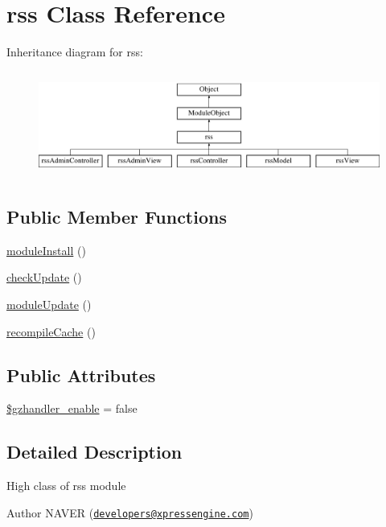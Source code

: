 \hypertarget{classrss}{\section{rss Class Reference}
\label{classrss}
}
Inheritance diagram for rss\-:\begin{figure}[H]
\begin{center}
\leavevmode
\includegraphics[height=3.500000cm]{classrss}
\end{center}
\end{figure}
\subsection*{Public Member Functions}
\begin{DoxyCompactItemize}
\item 
\hyperlink{classrss_a6730f54dbfe8b8d31066f3658f02185b}{module\-Install} ()
\item 
\hyperlink{classrss_abea52ff499087ead7116c986080a685a}{check\-Update} ()
\item 
\hyperlink{classrss_a68d8a7c97f3afd095c5ed5c1a304e8e5}{module\-Update} ()
\item 
\hyperlink{classrss_a422550360916bdd9ced66d334f75f3a9}{recompile\-Cache} ()
\end{DoxyCompactItemize}
\subsection*{Public Attributes}
\begin{DoxyCompactItemize}
\item 
\hyperlink{classrss_a46ac0a6862b1dc4dcc4a9db2b9c1b442}{\$gzhandler\-\_\-enable} = false
\end{DoxyCompactItemize}


\subsection{Detailed Description}
High class of rss module

\begin{DoxyAuthor}{Author}
N\-A\-V\-E\-R (\href{mailto:developers@xpressengine.com}{\tt developers@xpressengine.\-com}) 
\end{DoxyAuthor}


